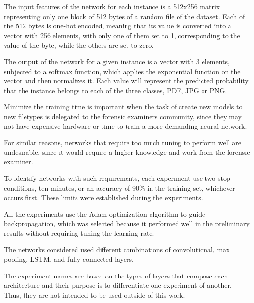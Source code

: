 

The input features of the network for each instance is a 512x256 matrix representing only one block of 512 bytes of a random file of the dataset. Each of the 512 bytes is one-hot encoded, meaning that its value is converted into a vector with 256 elements, with only one of them set to 1, corresponding to the value of the byte, while the others are set to zero.

The output of the network for a given instance is a vector with 3 elements, subjected to a softmax function, which applies the exponential function on the vector and then normalizes it. Each value will represent the predicted probability that the instance belongs to each of the three classes, PDF, JPG or PNG.

Minimize the training time is important when the task of create new models to new filetypes is delegated to the forensic examiners community, since they may not have expensive hardware or time to train a more demanding neural network.

For similar reasons, networks that require too much tuning to perform well are undesirable, since it would require a higher knowledge and work from the forensic examiner.


To identify networks with such requirements, each experiment use two stop conditions, ten minutes, or an accuracy of 90\% in the training set, whichever occurs first. These limits were established during the experiments.



All the experiments use the Adam \cite{kingma_adam:_2014}
optimization algorithm to guide backpropagation, which was selected because it performed well in the preliminary results without requiring tuning the learning rate.

The networks considered used different combinations of convolutional, max pooling, LSTM, and fully connected layers.

The experiment names are based on the types of layers that compose each architecture and their purpose is to differentiate one experiment of another. Thus, they are not intended to be used outside of this work.


